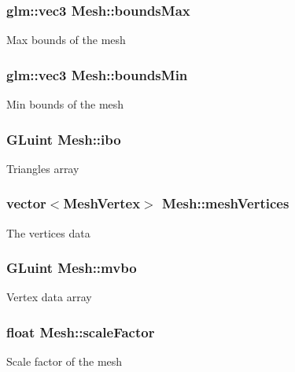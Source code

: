 \subsubsection[{bounds\+Max}]{\setlength{\rightskip}{0pt plus 5cm}glm\+::vec3 Mesh\+::bounds\+Max}\label{class_mesh_a430e466fef8de4297fb25aa8727b52e3}
Max bounds of the mesh \hypertarget{class_mesh_a0cb39dfb46a4eb89e748b7966f20e08b}{}
\subsubsection[{bounds\+Min}]{\setlength{\rightskip}{0pt plus 5cm}glm\+::vec3 Mesh\+::bounds\+Min}\label{class_mesh_a0cb39dfb46a4eb89e748b7966f20e08b}
Min bounds of the mesh \hypertarget{class_mesh_a8fb0190a2e74648537e452031c00fb8d}{}
\subsubsection[{ibo}]{\setlength{\rightskip}{0pt plus 5cm}G\+Luint Mesh\+::ibo}\label{class_mesh_a8fb0190a2e74648537e452031c00fb8d}
Triangles array \hypertarget{class_mesh_a91899b71cdc960ef485b07ffcd0c0cd6}{}
\subsubsection[{mesh\+Vertices}]{\setlength{\rightskip}{0pt plus 5cm}vector$<${\bf Mesh\+Vertex}$>$ Mesh\+::mesh\+Vertices}\label{class_mesh_a91899b71cdc960ef485b07ffcd0c0cd6}
The vertices data \hypertarget{class_mesh_ab24bc96d6c0f11d570a193fc133884a7}{}
\subsubsection[{mvbo}]{\setlength{\rightskip}{0pt plus 5cm}G\+Luint Mesh\+::mvbo}\label{class_mesh_ab24bc96d6c0f11d570a193fc133884a7}
Vertex data array \hypertarget{class_mesh_a1fc2f16522570f5e3bbed514ac322d9a}{}
\subsubsection[{scale\+Factor}]{\setlength{\rightskip}{0pt plus 5cm}float Mesh\+::scale\+Factor}\label{class_mesh_a1fc2f16522570f5e3bbed514ac322d9a}
Scale factor of the mesh \hypertarget{class_mesh_ad41061e78a04735d509e548141d43a49}{}
